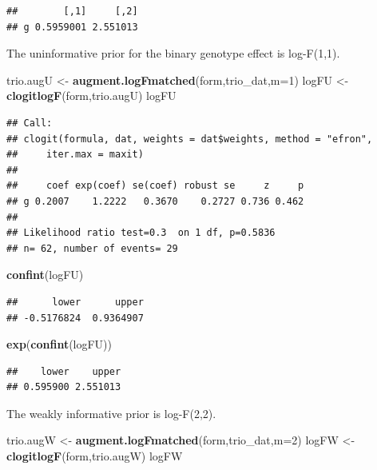 \documentclass[
]{article}
\newenvironment{Shaded}{\begin{snugshade}}{\end{snugshade}}
\newcommand{\AttributeTok}[1]{\textcolor[rgb]{0.13,0.29,0.53}{#1}}
\newcommand{\DecValTok}[1]{\textcolor[rgb]{0.00,0.00,0.81}{#1}}
\newcommand{\FunctionTok}[1]{\textcolor[rgb]{0.13,0.29,0.53}{\textbf{#1}}}
\newcommand{\NormalTok}[1]{#1}
\newcommand{\OtherTok}[1]{\textcolor[rgb]{0.56,0.35,0.01}{#1}}
\begin{document}
\begin{verbatim}
##        [,1]     [,2]
## g 0.5959001 2.551013
\end{verbatim}

The uninformative prior for the binary genotype effect is log-F(1,1).

\begin{Shaded}
\begin{Highlighting}[]
\NormalTok{trio.augU }\OtherTok{\textless{}{-}} \FunctionTok{augment.logFmatched}\NormalTok{(form,trio\_dat,}\AttributeTok{m=}\DecValTok{1}\NormalTok{)}
\NormalTok{logFU }\OtherTok{\textless{}{-}} \FunctionTok{clogitlogF}\NormalTok{(form,trio.augU)}
\NormalTok{logFU}
\end{Highlighting}
\end{Shaded}

\begin{verbatim}
## Call:
## clogit(formula, dat, weights = dat$weights, method = "efron", 
##     iter.max = maxit)
## 
##     coef exp(coef) se(coef) robust se     z     p
## g 0.2007    1.2222   0.3670    0.2727 0.736 0.462
## 
## Likelihood ratio test=0.3  on 1 df, p=0.5836
## n= 62, number of events= 29
\end{verbatim}

\begin{Shaded}
\begin{Highlighting}[]
\FunctionTok{confint}\NormalTok{(logFU)}
\end{Highlighting}
\end{Shaded}

\begin{verbatim}
##      lower      upper 
## -0.5176824  0.9364907
\end{verbatim}

\begin{Shaded}
\begin{Highlighting}[]
\FunctionTok{exp}\NormalTok{(}\FunctionTok{confint}\NormalTok{(logFU))}
\end{Highlighting}
\end{Shaded}

\begin{verbatim}
##    lower    upper 
## 0.595900 2.551013
\end{verbatim}

The weakly informative prior is log-F(2,2).

\begin{Shaded}
\begin{Highlighting}[]
\NormalTok{trio.augW }\OtherTok{\textless{}{-}} \FunctionTok{augment.logFmatched}\NormalTok{(form,trio\_dat,}\AttributeTok{m=}\DecValTok{2}\NormalTok{)}
\NormalTok{logFW }\OtherTok{\textless{}{-}} \FunctionTok{clogitlogF}\NormalTok{(form,trio.augW)}
\NormalTok{logFW}
\end{Highlighting}
\end{Shaded}
\end{document}
